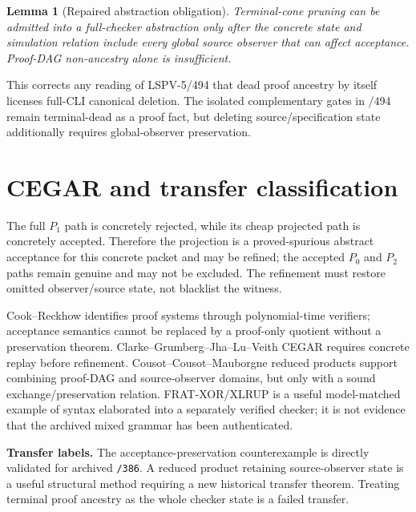 \documentclass[11pt]{article}
\newtheorem{lemma}{Lemma}
\begin{document}
\begin{lemma}[Repaired abstraction obligation]
Terminal-cone pruning can be admitted into a full-checker abstraction only after the concrete state and simulation relation include every global source observer that can affect acceptance.
Proof-DAG non-ancestry alone is insufficient.
\end{lemma}
This corrects any reading of LSPV-5/494 that dead proof ancestry by itself licenses full-CLI canonical deletion.
The isolated complementary gates in /494 remain terminal-dead as a proof fact, but deleting source/specification state additionally requires global-observer preservation.

\section*{CEGAR and transfer classification}
The full \(P_1\) path is concretely rejected, while its cheap projected path is concretely accepted.
Therefore the projection is a proved-spurious abstract acceptance for this concrete packet and may be refined; the accepted \(P_0\) and \(P_2\) paths remain genuine and may not be excluded.
The refinement must restore omitted observer/source state, not blacklist the witness.

Cook--Reckhow identifies proof systems through polynomial-time verifiers; acceptance semantics cannot be replaced by a proof-only quotient without a preservation theorem.
Clarke--Grumberg--Jha--Lu--Veith CEGAR requires concrete replay before refinement.
Cousot--Cousot--Mauborgne reduced products support combining proof-DAG and source-observer domains, but only with a sound exchange/preservation relation.
FRAT-XOR/XLRUP is a useful model-matched example of syntax elaborated into a separately verified checker; it is not evidence that the archived mixed grammar has been authenticated.

\textbf{Transfer labels.}
The acceptance-preservation counterexample is directly validated for archived \texttt{/386}.
A reduced product retaining source-observer state is a useful structural method requiring a new historical transfer theorem.
Treating terminal proof ancestry as the whole checker state is a failed transfer.
\end{document}
